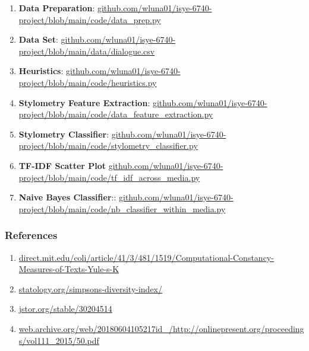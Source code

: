 \documentclass{article}
\begin{document}
\begin{titlepage}
\begin{enumerate}
\item \textbf{Data Preparation}: \url{github.com/wluna01/isye-6740-project/blob/main/code/data_prep.py}
\item \textbf{Data Set}: \url{github.com/wluna01/isye-6740-project/blob/main/data/dialogue.csv}
\item \textbf{Heuristics}: \url{github.com/wluna01/isye-6740-project/blob/main/code/heuristics.py}
\item \textbf{Stylometry Feature Extraction}: \url{github.com/wluna01/isye-6740-project/blob/main/code/data_feature_extraction.py}
\item \textbf{Stylometry Classifier}: \url{github.com/wluna01/isye-6740-project/blob/main/code/stylometry_classifier.py}
\item \textbf{TF-IDF Scatter Plot} \url{github.com/wluna01/isye-6740-project/blob/main/code/tf_idf_across_media.py}
\item \textbf{Naive Bayes Classifier}:: \url{github.com/wluna01/isye-6740-project/blob/main/code/nb_classifier_within_media.py}
\end{enumerate}

\subsubsection{References}

\begin{enumerate}
\item \url{direct.mit.edu/coli/article/41/3/481/1519/Computational-Constancy-Measures-of-Texts-Yule-s-K}
\item \url{statology.org/simpsons-diversity-index/}
\item \url{jstor.org/stable/30204514}
\item \url{web.archive.org/web/20180604105217id_/http://onlinepresent.org/proceedings/vol111_2015/50.pdf}
\end{enumerate}

\end{titlepage}
\end{document}
